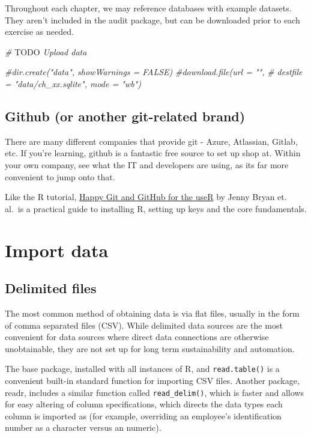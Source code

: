 \documentclass[
]{book}
\newenvironment{Shaded}{\begin{snugshade}}{\end{snugshade}}
\newcommand{\AlertTok}[1]{\textcolor[rgb]{0.94,0.16,0.16}{#1}}
\newcommand{\CommentTok}[1]{\textcolor[rgb]{0.56,0.35,0.01}{\textit{#1}}}
\begin{document}
Throughout each chapter, we may reference databases with example datasets. They aren't included in the audit package, but can be downloaded prior to each exercise as needed.

\begin{Shaded}
\begin{Highlighting}[]
\CommentTok{# }\AlertTok{TODO}\CommentTok{ Upload data}

\CommentTok{#dir.create("data", showWarnings = FALSE)}
\CommentTok{#download.file(url = "",}
\CommentTok{#              destfile = "data/ch_xx.sqlite", mode = "wb")}
\end{Highlighting}
\end{Shaded}

\hypertarget{github-or-another-git-related-brand}{%
\section{Github (or another git-related brand)}\label{github-or-another-git-related-brand}}

There are many different companies that provide git - Azure, Atlassian, Gitlab, etc. If you're learning, github is a fantastic free source to set up shop at. Within your own company, see what the IT and developers are using, as its far more convenient to jump onto that.

Like the R tutorial, \href{https://happygitwithr.com}{Happy Git and GitHub for the useR} by Jenny Bryan et. al.~is a practical guide to installing R, setting up keys and the core fundamentals.

\hypertarget{import-data}{%
\chapter{Import data}\label{import-data}}

\hypertarget{delimited-files}{%
\section{Delimited files}\label{delimited-files}}

The most common method of obtaining data is via flat files, usually in the form of comma separated files (CSV). While delimited data sources are the most convenient for data sources where direct data connections are otherwise unobtainable, they are not set up for long term sustainability and automation.

The base package, installed with all instances of R, and \texttt{read.table()} is a convenient built-in standard function for importing CSV files. Another package, readr, includes a similar function called \texttt{read\_delim()}, which is faster and allows for easy altering of column specifications, which directs the data types each column is imported as (for example, overriding an employee's identification number as a character versus an numeric).
\end{document}
